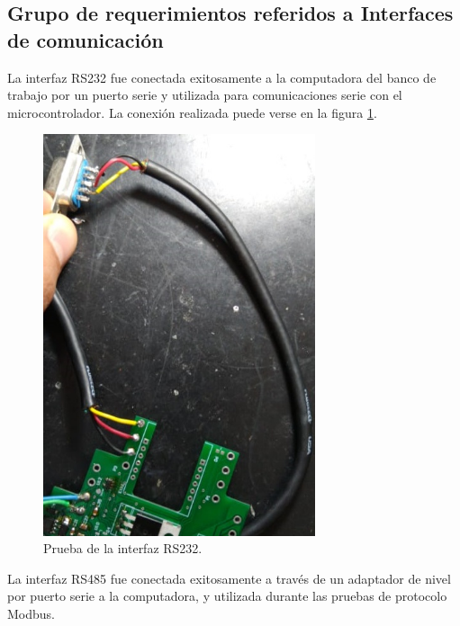 

\subsection{Grupo de requerimientos referidos a Interfaces de comunicación}

La interfaz RS232 fue conectada exitosamente a la computadora del banco de trabajo por un puerto serie  y utilizada para comunicaciones serie con el microcontrolador. La conexión realizada puede verse en la figura \ref{fig:Rs232prott}.

\begin{figure}[!htb]
	\centering
	\includegraphics[width=80mm ,keepaspectratio]{Figures/ConRS232.jpeg}
	\caption{ Prueba de la interfaz RS232.}
	\label{fig:Rs232prott}
\end{figure}
La interfaz RS485 fue conectada exitosamente a través de un adaptador de nivel por puerto serie a la computadora, y utilizada durante las pruebas de protocolo Modbus.

